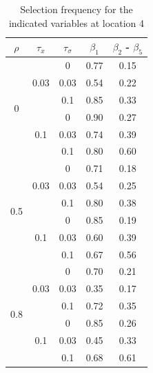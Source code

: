 \documentclass[authoryear, review, 11pt]{elsarticle}
\begin{document}
		
		\begin{table}[ht]
		\begin{center}
		\begin{tabular}{ccc|cc}
		$\rho$ & $\tau_x$ & $\tau_\sigma$ &  $\beta_1$ & $\beta_2$ - $\beta_5$ \\ 
		  \hline
		\multirow{6}{*}{0} & \multirow{3}{*}{0.03} & 0 & 0.77 & 0.15 \\ 
		 &  & 0.03 &   0.54 & 0.22 \\ 
		 &  & 0.1 &   0.85 & 0.33 \\ \cline{2-5}
		 & \multirow{3}{*}{0.1} & 0 &   0.90 & 0.27 \\ 
		 &  & 0.03 &   0.74 & 0.39 \\ 
		 &  & 0.1 &   0.80 & 0.60 \\ \cline{1-5}
		\multirow{6}{*}{0.5} & \multirow{3}{*}{0.03} & 0 &   0.71 & 0.18 \\ 
		 &  & 0.03 &   0.54 & 0.25 \\ 
		 &  & 0.1 &   0.80 & 0.38 \\ \cline{2-5}
		 & \multirow{3}{*}{0.1} & 0 &   0.85 & 0.19 \\ 
		 &  & 0.03 &   0.60 & 0.39 \\ 
		 &  & 0.1 &   0.67 & 0.56 \\ \cline{1-5}
		\multirow{6}{*}{0.8} & \multirow{3}{*}{0.03} & 0 &   0.70 & 0.21 \\ 
		 &  & 0.03 &   0.35 & 0.17 \\ 
		 &  & 0.1 &   0.72 & 0.35 \\ \cline{2-5}
		 & \multirow{3}{*}{0.1} & 0 &   0.85 & 0.26 \\ 
		 &  & 0.03 &   0.45 & 0.33 \\ 
		 &  & 0.1 &   0.68 & 0.61 \\ 
		  \end{tabular}
		\caption{Selection frequency for the indicated variables at location 4\label{table:loc4-selection}}
		\end{center}
		\end{table}
\end{document}

